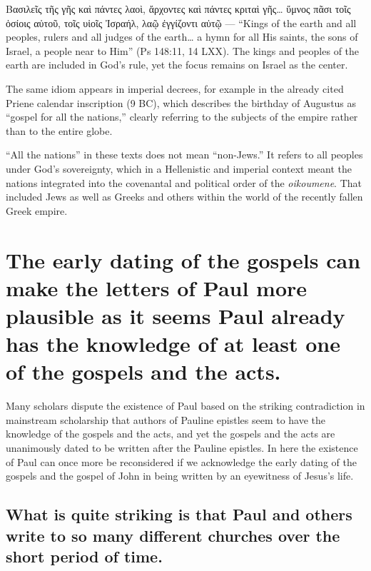 Βασιλεῖς τῆς γῆς καὶ πάντες λαοὶ, ἄρχοντες καὶ πάντες κριταὶ γῆς… ὕμνος πᾶσι τοῖς ὁσίοις αὐτοῦ, τοῖς υἱοῖς Ἰσραήλ, λαῷ ἐγγίζοντι αὐτῷ — “Kings of the earth and all peoples, rulers and all judges of the earth… a hymn for all His saints, the sons of Israel, a people near to Him” (Ps 148:11, 14 LXX).
The kings and peoples of the earth are included in God’s rule, yet the focus remains on Israel as the center.

The same idiom appears in imperial decrees, for example in the already cited Priene calendar inscription (9 BC), which describes the birthday of Augustus as “gospel for all the nations,” clearly referring to the subjects of the empire rather than to the entire globe.

“All the nations” in these texts does not mean “non-Jews.”
It refers to all peoples under God’s sovereignty, which in a Hellenistic and imperial context meant the nations integrated into the covenantal and political order of the \textit{oikoumene}.
That included Jews as well as Greeks and others within the world of the recently fallen Greek empire.

\section{The early dating of the gospels can make the letters of Paul more plausible as it seems Paul already has the knowledge of at least one of the gospels and the acts.}\label{sec:the-early-dating-of-the-gospels-can-make-the-letters-of-paul-more-plausible-as-it-seems-paul-already-has-the-knowledge-of-at-least-one-of-the-gospels-and-the-acts.}

Many scholars dispute the existence of Paul based on the striking contradiction in mainstream scholarship that authors of Pauline epistles seem to have the knowledge of the gospels and the acts, and yet the gospels and the acts are unanimously dated to be written after the Pauline epistles.
In here the existence of Paul can once more be reconsidered if we acknowledge the early dating of the gospels and the gospel of John in being written by an eyewitness of Jesus's life.

\subsection{What is quite striking is that Paul and others write to so many different churches over the short period of time.}\label{subsec:what-is-quite-striking-is-that-paul-and-others-write-to-so-many-different-churches-over-the-short-period-of-time.}

